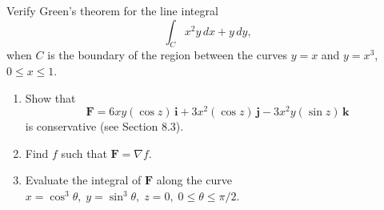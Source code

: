 \documentclass[openany]{book}
\begin{document}
\begin{prob}[4]
    Verify Green's theorem for the line integral
    \[
    \int_C x^2 y \, dx + y \, dy,
    \]
    when \( C \) is the boundary of the region between the curves \( y = x \) and \( y = x^3 \), \( 0 \leq x \leq 1 \).
\end{prob}

\begin{prob}[7]
    \begin{enumerate}
        \item[(a)] Show that  
        \[
        \mathbf{F} = 6xy(\cos z) \, \mathbf{i} + 3x^2(\cos z) \, \mathbf{j} - 3x^2 y(\sin z) \, \mathbf{k}
        \]
        is conservative (see Section 8.3). 
        \item[(b)] Find \( f \) such that \( \mathbf{F} = \nabla f \).  
        \item[(c)] Evaluate the integral of \( \mathbf{F} \) along the curve \( x = \cos^3 \theta, \; y = \sin^3 \theta, \; z = 0, \; 0 \leq \theta \leq \pi/2 \).
    \end{enumerate}
\end{prob}
\end{document}
